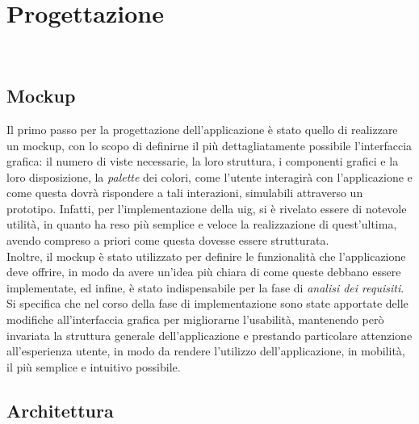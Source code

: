 \chapter{Progettazione}
\label{cap:progettazione}

\\

\section{Mockup}
\label{sec:mockup}

Il primo passo per la progettazione dell'applicazione è stato quello di realizzare un \gls{mockup}\glsoccur, con lo scopo di definirne il più dettagliatamente possibile l'interfaccia grafica: il numero di viste necessarie, la loro struttura, i componenti grafici e la loro disposizione, la \emph{palette} dei colori, come l'utente interagirà con l'applicazione e come questa dovrà rispondere a tali interazioni, simulabili attraverso un prototipo. Infatti, per l'implementazione della \gls{uig}\glsoccur, si è rivelato essere di notevole utilità, in quanto ha reso più semplice e veloce la realizzazione di quest'ultima, avendo compreso a priori come questa dovesse essere strutturata.\\
Inoltre, il \gls{mockup} è stato utilizzato per definire le funzionalità che l'applicazione deve offrire, in modo da avere un'idea più chiara di come queste debbano essere implementate, ed infine, è stato indispensabile per la fase di \emph{analisi dei requisiti}.\\ 
Si specifica che nel corso della fase di implementazione sono state apportate delle modifiche all'interfaccia grafica per migliorarne l'usabilità, mantenendo però invariata la struttura generale dell'applicazione e prestando particolare attenzione all'esperienza utente, in modo da rendere l'utilizzo dell'applicazione, in mobilità, il più semplice e intuitivo possibile.

\section{Architettura}
\label{sec:architettura}

